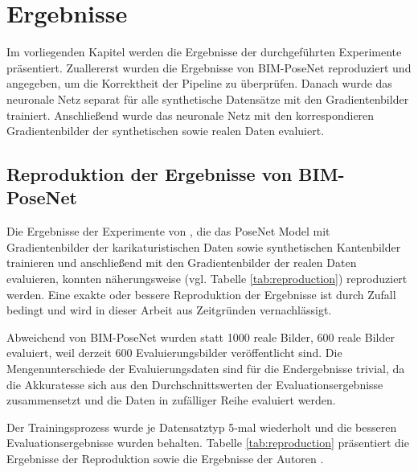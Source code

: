 
\section{Ergebnisse}
Im vorliegenden Kapitel werden die Ergebnisse der durchgeführten Experimente präsentiert. Zuallererst wurden die Ergebnisse von BIM-PoseNet \cite{acharyaBIMPoseNetIndoorCamera2019} reproduziert und angegeben, um die Korrektheit der Pipeline zu überprüfen. Danach wurde das neuronale Netz separat für alle synthetische Datensätze mit den Gradientenbilder trainiert. Anschließend wurde das neuronale Netz mit den korrespondieren Gradientenbilder der synthetischen sowie realen Daten evaluiert.


\subsection{Reproduktion der Ergebnisse von BIM-PoseNet}
Die Ergebnisse der Experimente von \citet{acharyaBIMPoseNetIndoorCamera2019}, die das PoseNet Model mit Gradientenbilder der karikaturistischen Daten sowie synthetischen Kantenbilder trainieren und anschließend mit den Gradientenbilder der realen Daten evaluieren, konnten näherungsweise (vgl. Tabelle \ref{tab:reproduction}) reproduziert werden. Eine exakte oder bessere Reproduktion der Ergebnisse ist durch Zufall bedingt und wird in dieser Arbeit aus Zeitgründen vernachlässigt.

Abweichend von BIM-PoseNet wurden statt 1000 reale Bilder, 600 reale Bilder evaluiert, weil derzeit 600 Evaluierungsbilder veröffentlicht sind. Die Mengenunterschiede der Evaluierungsdaten sind für die Endergebnisse trivial, da die Akkuratesse sich aus den Durchschnittswerten der Evaluationsergebnisse zusammensetzt und die Daten in zufälliger Reihe evaluiert werden. 

Der Trainingsprozess wurde je Datensatztyp 5-mal wiederholt und die besseren Evaluationsergebnisse wurden behalten. Tabelle \ref{tab:reproduction} präsentiert die Ergebnisse der Reproduktion sowie die Ergebnisse der Autoren \citet{acharyaBIMPoseNetIndoorCamera2019}.


